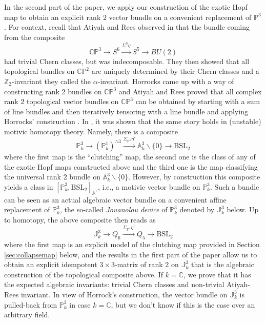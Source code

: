 \documentclass[11pt,leqno]{article}
\newcommand{\cplx}{{\mathbb C}}
\newcommand{\Z}{{\mathbb Z}}
\newcommand{\A}{{\mathbb A}}
\newcommand{\Proj}{{\mathbb P}}
\newcommand{\pone}{{\mathbb P}^1}
\renewcommand{\1}{{\rm 1\hspace*{-0.4ex}%
\rule{0.1ex}{1.52ex}\hspace*{0.2ex}}}
\newcommand{\<}[1]{{\langle}#1 {\rangle}}
\theoremstyle{plain}
\theoremstyle{definition}
\theoremstyle{remark}
\numberwithin{equation}{section}
\begin{document}
In the second part of the paper, we apply our construction of the exotic Hopf map to obtain an explicit rank $2$ vector bundle on a convenient replacement of $\mathbb{P}^3$. For context, recall that Atiyah and Rees observed in \cite{Atiyah76} that the bundle coming from the composite 
\[
\cplx\Proj^3 \to S^6 \xrightarrow{\Sigma^3 \eta }  S^5 \to BU(2)
\]
had trivial Chern classes, but was indecomposable. They then showed that all topological bundles on $\cplx \Proj^2$ are uniquely determined by their Chern classes and a $\Z_2$-invariant they called the $\alpha$-invariant. Horrocks \cite{Horrocks68} came up with a way of constructing rank $2$ bundles on $\cplx\Proj^3$ and Atiyah and Rees proved that all complex rank $2$ topological vector bundles on $\cplx\Proj^3$ can be obtained by starting with a sum of line bundles and then iteratively tensoring with a line bundle and applying Horrocks' construction \cite[Theorem 1.1]{Atiyah76}. In \cite{Asok20b}, it was shown that the same story holds in (unstable) motivic homotopy theory. Namely, there is a composite
\[
\Proj^3_k \to (\pone_k)^{\wedge 3} \xrightarrow{\Sigma_{\Proj^1}\eta' }  \A^3_k\smallsetminus\{0\} \to \mathrm{BSL}_2
\]
where the first map is the ``clutching'' map, the second one is the class of any of the exotic Hopf maps constructed above and the third one is the map classifying the universal rank $2$ bundle on $ \A^3_k\smallsetminus\{0\}$. However, by construction this composite yields a class in $[\Proj^3_k,\mathrm{BSL}_2]_{\A^1}$, i.e., a motivic vector bundle on $\mathbb{P}^3_k$. Such a bundle can be seen as an actual algebraic vector bundle on a convenient affine replacement of $\mathbb{P}^3_k$, the so-called \emph{Jouanolou device} of $\mathbb{P}^3_k$ denoted by $\mathbb{J}^3_k$ below. Up to homotopy, the above composite then reads as
\[
\mathbb{J}^3_k \to Q_6 \xrightarrow{\Sigma_{\Proj^1}\eta' }  Q_5 \to \mathrm{BSL}_2
\]
where the first map is an explicit model of the clutching map provided in Section \ref{sec:collapsemap} below, and the results in the first part of the paper allow us to obtain an explicit idempotent $3\times 3$-matrix of rank $2$ on $\mathbb{J}^3_k$ that is the algebraic construction of the topological composite above.  If $k=\cplx$, we prove that it has the expected algebraic invariants: trivial Chern classes and non-trivial Atiyah-Rees invariant. In view of Horrock's construction, the vector bundle on $\mathbb{J}^3_k$ is pulled-back from $\Proj^3_k$ in case $k=\cplx$, but we don't know if this is the case over an arbitrary field. 
\end{document}
